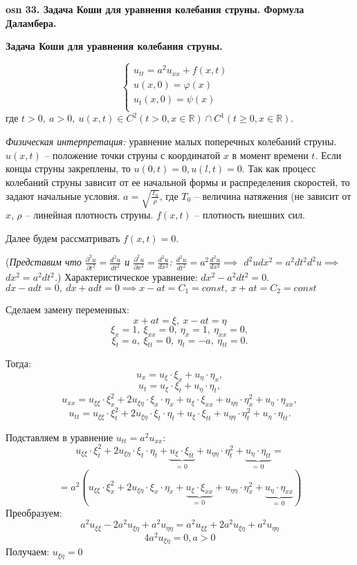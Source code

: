 \textbf{\LARGE osn 33. Задача Коши для уравнения колебания струны. Формула Даламбера.}

\textbf{Задача Коши для уравнения колебания струны.}

$$\begin{cases}
u_{tt}=a^2u_{xx}+f(x,t)&\\
u(x,0)=\varphi(x)&\\
u_t(x,0)=\psi(x)&\\
\end{cases}$$ где $t>0,~a>0,~u(x,t)\in C^2(t > 0, x\in \mathbb{R})\cap C^1(t \geqslant 0, x\in \mathbb{R})$.

\bigbreak
\textit{Физическая интерпретация:} уравнение малых поперечных колебаний струны. $u(x,t)$ -- положение точки струны с координатой $x$ в момент времени $t$. Если концы струны закреплены, то $u(0,t)=0, u(l,t)=0$. Так как процесс колебаний струны зависит от ее начальной формы и распределения скоростей, то задают начальные условия. $a = \sqrt{\frac{T_0}{\rho}}$, где $T_0$ -- величина натяжения (не зависит от $x$, $\rho$ -- линейная плотность струны. $f(x,t)$ -- плотность внешних сил.

\bigbreak
Далее будем рассматривать $f(x,t) = 0$.
\bigbreak

(\textit{Представим что $\frac{\partial^2u}{\partial t^2} = \frac{d^2u}{dt^2}$ и $\frac{\partial^2u}{\partial x^2} = \frac{d^2u}{dx^2}$:
$\frac{d^2u}{dt^2} = a^2\frac{d^2u}{dx^2} \implies$
${d^2udx^2 = a^2dt^2d^2u} \implies$
${dx^2 = a^2dt^2}$.})
Характеристическое уравнение: $dx^2-a^2dt^2=0$. \\
$dx - adt=0, ~ dx+adt = 0 \implies x-at=C_1 = const, ~ x+at=C_2 = const$

Сделаем замену переменных: $$x+at=\xi,~x-at=\eta$$
$$\xi_x=1, ~ \xi_{xx}=0, ~ \eta_x = 1,  ~ \eta_{xx} = 0,$$
$$\xi_t=a, ~ \xi_{tt}=0, ~ \eta_t = -a, ~ \eta_{tt} = 0.$$

Тогда:
$$u_x=u_{\xi}\cdot\xi_x+u_{\eta}\cdot\eta_x,$$
$$u_t=u_{\xi}\cdot\xi_t+u_{\eta}\cdot\eta_t,$$
$$u_{xx}=u_{\xi\xi}\cdot\xi_x^2+2u_{\xi\eta}\cdot\xi_x\cdot\eta_x+u_{\xi}\cdot\xi_{xx}+u_{\eta\eta}\cdot\eta_x^2+u_{\eta}\cdot\eta_{xx},$$
$$u_{tt}=u_{\xi\xi}\cdot\xi_t^2+2u_{\xi\eta}\cdot\xi_t\cdot\eta_t+u_{\xi}\cdot\xi_{tt}+u_{\eta\eta}\cdot\eta_t^2+u_{\eta}\cdot\eta_{tt}.$$

Подставляем в уравнение $u_{tt}=a^2u_{xx}$:
$$u_{\xi\xi}\cdot\xi_t^2+2u_{\xi\eta}\cdot\xi_t\cdot\eta_t+\displaystyle\underbrace{u_{\xi}\cdot\xi_{tt}}_{\text{= 0}}+u_{\eta\eta}\cdot\eta_t^2+\displaystyle\underbrace{u_{\eta}\cdot\eta_{tt}}_{\text{= 0}}=$$ $$=a^2(u_{\xi\xi}\cdot\xi_x^2+2u_{\xi\eta}\cdot\xi_x\cdot\eta_x+\displaystyle\underbrace{u_{\xi}\cdot\xi_{xx}}_{\text{= 0}}+u_{\eta\eta}\cdot\eta_x^2+\displaystyle\underbrace{u_{\eta}\cdot\eta_{xx}}_{\text{= 0}})$$
Преобразуем:
$$a^2u_{\xi\xi}-2a^2u_{\xi\eta}+a^2u_{\eta\eta}=a^2u_{\xi\xi}+2a^2u_{\xi\eta}+a^2u_{\eta\eta}$$
$$4a^2u_{\xi\eta}=0,   a>0$$
Получаем: $u_{\xi\eta}=0$

